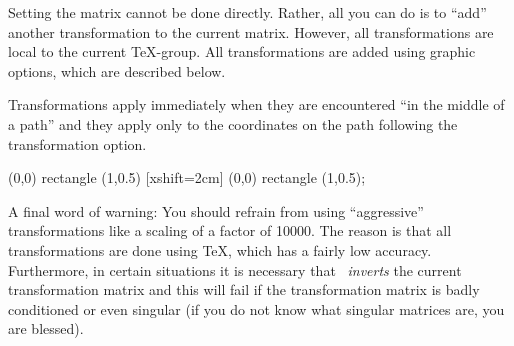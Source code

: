 Setting the matrix cannot be done directly. Rather, all you can do is
to ``add'' another transformation to the current matrix. However, all
transformations are local to the current \TeX-group. All
transformations are added using graphic options, which are described
below.

Transformations apply immediately when they are encountered ``in the
middle of a path'' and they apply only to the coordinates on the path
following the transformation option. 

\begin{codeexample}[]
\tikz \draw (0,0) rectangle (1,0.5) [xshift=2cm] (0,0) rectangle (1,0.5);
\end{codeexample}

A final word of warning: You should refrain from using ``aggressive''
transformations like a scaling of a factor of 10000. The reason is
that all transformations are done using \TeX, which has a fairly low
accuracy. Furthermore, in certain situations it is necessary that
\tikzname\ \emph{inverts} the current transformation matrix and this will
fail if the transformation matrix is badly conditioned or even
singular (if you do not know what singular matrices are, you are blessed).   

